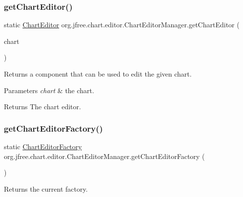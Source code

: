 \subsubsection{\texorpdfstring{get\+Chart\+Editor()}{getChartEditor()}}
{\footnotesize\ttfamily static \mbox{\hyperlink{interfaceorg_1_1jfree_1_1chart_1_1editor_1_1_chart_editor}{Chart\+Editor}} org.\+jfree.\+chart.\+editor.\+Chart\+Editor\+Manager.\+get\+Chart\+Editor (\begin{DoxyParamCaption}\item[{\mbox{\hyperlink{classorg_1_1jfree_1_1chart_1_1_j_free_chart}{J\+Free\+Chart}}}]{chart }\end{DoxyParamCaption})\hspace{0.3cm}{\ttfamily [static]}}

Returns a component that can be used to edit the given chart.


\begin{DoxyParams}{Parameters}
{\em chart} & the chart.\\
\hline
\end{DoxyParams}
\begin{DoxyReturn}{Returns}
The chart editor. 
\end{DoxyReturn}
\mbox{\label{classorg_1_1jfree_1_1chart_1_1editor_1_1_chart_editor_manager_ac8b452e09e624ece012381d03b482c8b}} 
\subsubsection{\texorpdfstring{get\+Chart\+Editor\+Factory()}{getChartEditorFactory()}}
{\footnotesize\ttfamily static \mbox{\hyperlink{interfaceorg_1_1jfree_1_1chart_1_1editor_1_1_chart_editor_factory}{Chart\+Editor\+Factory}} org.\+jfree.\+chart.\+editor.\+Chart\+Editor\+Manager.\+get\+Chart\+Editor\+Factory (\begin{DoxyParamCaption}{ }\end{DoxyParamCaption})\hspace{0.3cm}{\ttfamily [static]}}

Returns the current factory.

